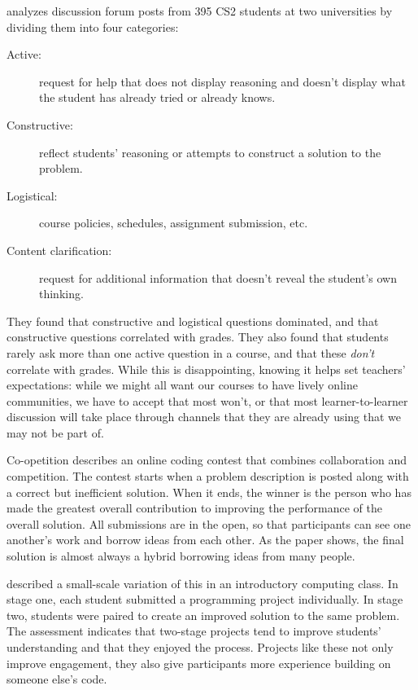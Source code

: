 \cite{Vell2017} analyzes discussion forum posts from 395 CS2 students at two universities
by dividing them into four categories:

\begin{description}

\item[Active:]
  request for help that does not display reasoning
  and doesn't display what the student has already tried or already knows.

\item[Constructive:]
  reflect students' reasoning
  or attempts to construct a solution to the problem.

\item[Logistical:]
  course policies, schedules, assignment submission, etc.

\item[Content clarification:]
  request for additional information
  that doesn't reveal the student's own thinking.

\end{description}

They found that constructive and logistical questions dominated,
and that constructive questions correlated with grades.
They also found that students rarely ask more than one active question in a course,
and that these \emph{don't} correlate with grades.
While this is disappointing,
knowing it helps set teachers' expectations:
while we might all want our courses to have lively online communities,
we have to accept that most won't,
or that most learner-to-learner discussion will take place
through channels that they are already using
that we may not be part of.

\begin{aside}{Co-opetition}
  \cite{Gull2004} describes an online coding contest that combines collaboration and competition.
  The contest starts when a problem description is posted along with a correct but inefficient solution.
  When it ends,
  the winner is the person who has made the greatest overall contribution
  to improving the performance of the overall solution.
  All submissions are in the open,
  so that participants can see one another's work and borrow ideas from each other.
  As the paper shows,
  the final solution is almost always a hybrid borrowing ideas from many people.

  \cite{Batt2018} described a small-scale variation of this in an introductory computing class.
  In stage one,
  each student submitted a programming project individually.
  In stage two,
  students were paired to create an improved solution to the same problem.
  The assessment indicates that two-stage projects tend to improve students' understanding
  and that they enjoyed the process.
  Projects like these not only improve engagement,
  they also give participants more experience building on someone else's code.
\end{aside}

